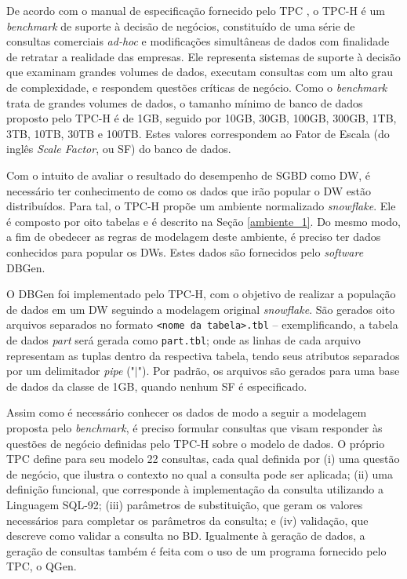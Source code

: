 De acordo com o manual de especificação fornecido pelo TPC \cite{tpc2017specs}, o TPC-H é um \textit{\textit{benchmark}} de suporte à decisão de negócios, constituído de uma série de consultas comerciais \textit{ad-hoc} e modificações simultâneas de dados com finalidade de retratar a realidade das empresas. Ele representa sistemas de suporte à decisão que examinam grandes volumes de dados, executam consultas com um alto grau de complexidade, e respondem questões críticas de negócio. Como o \textit{\textit{benchmark}} trata de grandes volumes de dados, o tamanho mínimo de banco de dados proposto pelo TPC-H é de 1GB, seguido por 10GB, 30GB, 100GB, 300GB, 1TB, 3TB, 10TB, 30TB e 100TB. Estes valores correspondem ao Fator de Escala (do inglês \textit{Scale Factor}, ou SF) do banco de dados. 

Com o intuito de avaliar o resultado do desempenho de SGBD como DW, é necessário ter conhecimento de como os dados que irão popular o DW estão distribuídos. Para tal, o TPC-H propõe um ambiente normalizado \textit{snowflake}. Ele é composto por oito tabelas e é descrito na Seção \ref{ambiente_1}. Do mesmo modo, a fim de obedecer as regras de modelagem deste ambiente, é preciso ter dados conhecidos para popular os DWs. Estes dados são fornecidos pelo \textit{software} DBGen.

O DBGen foi implementado pelo TPC-H, com o objetivo de realizar a população de dados em um DW seguindo a modelagem original \textit{snowflake}. São gerados oito arquivos separados no formato \texttt{<nome da tabela>.tbl} -- exemplificando, a tabela de dados \textit{part} será gerada como \texttt{part.tbl}; onde as linhas de cada arquivo representam as tuplas dentro da respectiva tabela, tendo seus atributos separados por um delimitador \textit{pipe} ("$\mid$"). Por padrão, os arquivos são gerados para uma base de dados da classe de 1GB, quando nenhum SF é especificado.

Assim como é necessário conhecer os dados de modo a seguir a modelagem proposta pelo \textit{benchmark}, é preciso formular consultas que visam responder às questões de negócio definidas pelo TPC-H sobre o modelo de dados. O próprio TPC define para seu modelo 22 consultas, cada qual definida por (i) uma questão de negócio, que ilustra o contexto no qual a consulta pode ser aplicada; (ii) uma definição funcional, que corresponde à implementação da consulta utilizando a Linguagem SQL-92; (iii) parâmetros de substituição, que geram os valores necessários para completar os parâmetros da consulta; e (iv) validação, que descreve como validar a consulta no BD. Igualmente à geração de dados, a geração de consultas também é feita com o uso de um programa fornecido pelo TPC, o QGen.

